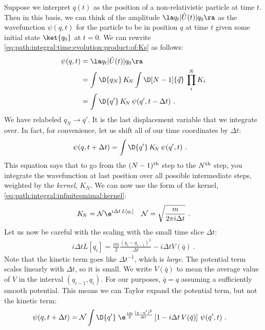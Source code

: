 Suppose we interpret $q(t)$ as the position of a non-relativistic particle at time $t$. Then in this basis, we can think of the amplitude $\la q_t | \hat U(t) | q_0 \ra$ as the wavefunction $\psi(q, t)$ for the particle to be in position $q$ at time $t$ given some initial state $\ket{q_0}$ at $t=0$. We can rewrite \eqref{eq:path:integral:time:evolution:product:of:Ks} as follows:
\begin{align}
    \psi(q,t) &= \la q_t | \hat U(t) | q_0 \ra 
    \\&= \int \D{q_N} \, K_{\!N} \int \D[N-1]{\vec{q}} \,
    \prod_i^{N} K_i 
    \\
    &= \int \D{q'} \, K_{\!N}\, \psi(q',t-\Delta t) \ .
\end{align}
We have relabeled $q_N \to q'$. It is the last displacement variable that we integrate over. In fact, for convenience, let us shift all of our time coordinates by $\Delta t$: 
\begin{align}
    \psi(q,t+\Delta t) 
    &= \int \D{q'} \, K_{\!N}\, \psi(q',t) \ .
\end{align}
This equation says that to go from the $(N-1)^\textnormal{th}$ step to the $N^\textnormal{th}$ step, you integrate the wavefunction at last position over all possible intermediate steps, weighted by the \emph{kernel}, $K_N$. We can now use the form of the kernel, \eqref{eq:path:integral:infinitesmimal:kernel}:
\begin{align}
    K_{\!N} &= \mathcal N \e^{i\Delta t\, L[q_i]}
    &
    \mathcal N = \sqrt{\frac{m}{2\pi i \Delta t}} \ .
    \label{eq:path:integral:normalization}
\end{align}
Let us now be careful with the scaling with the small time slice $\Delta t$:
\begin{align}
    i\Delta t L[q_i] = \frac{im}{2}\frac{(q_i-q_{i-1})^2}{\Delta t} - i\Delta t V(\bar q) \ .
\end{align}
Note that the kinetic term goes like $\Delta t^{-1}$, which is \emph{large}. The potential term scales linearly with $\Delta t$, so it is small. We write $V(\bar q)$ to mean the average value of $V$ in the interval $(q_{i-1}, q_i)$. For our purposes, $\bar q = q$ assuming a sufficiently smooth potential. This means we can Taylor expand the potential term, but not the kinetic term:
\begin{align}
    \psi(q,t+\Delta t) &= \mathcal N\int \D{q'}\; 
    \e^{\frac{im}{2}\frac{(q-q')^2}{\Delta t}} 
    \left[1 - i\Delta t \, V(\bar q)\right]\,
    \psi(q',t) \ .
\end{align}
